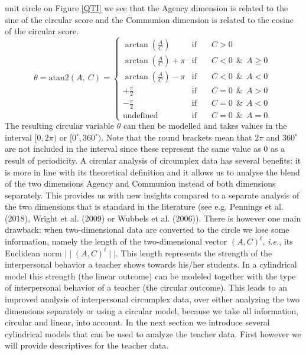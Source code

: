 \documentclass[man]{apa6}
\begin{document}
unit circle on Figure \ref{QTI} we see that the Agency dimension is related to
the sine of the circular score and the Communion dimension is related to the
cosine of the circular score.
\begin{equation}\label{PredVal}
\theta          = \text{atan2}\left(A, \: C\right)  =
\left\{{\begin{array}{lcl}
                                                                       \arctan\left(\frac{A}{C}\right) & \text{if}  \quad&C > 0 \\
\arctan\left(\frac{A}{C}\right) + \pi & \text{if}  \quad& C  <  0  \:\: \&\:\: A \geq 0\\
 \arctan\left(\frac{A}{C}\right) - \pi & \text{if}  \quad&C  <  0 \:\:  \&\:\:A  < 0\\
 +\frac{\pi}{2} & \text{if}  \quad& C  =  0  \:\: \&\:\:A > 0\\
 -\frac{\pi}{2} & \text{if}  \quad& C =  0  \:\: \&\:\:A < 0\\
 \text{undefined} & \text{if} \quad& C =  0   \:\: \&\:\:A = 0.
 \end{array}}
\right.
\end{equation}
The resulting circular variable \(\theta\) can then be modelled and takes values
in the interval \([0, 2\pi)\) or \([0^\circ, 360^\circ)\). Note that the round
brackets mean that \(2\pi\) and \(360^\circ\) are not included in the interval since
these represent the same value as 0 as a result of periodicity. \newline
\indent A circular analysis of circumplex data has several benefits: it is more
in line with its theoretical definition and it allows us to analyse the blend of
the two dimensions Agency and Communion instead of both dimensions separately.
This provides us with new insights compared to a separate analysis of the two
dimensions that is standard in the literature (see e.g.
Pennings et al. (2018), Wright et al. (2009) or
Wubbels et al. (2006)). There is however one main drawback: when
two-dimensional data are converted to the circle we lose some information,
namely the length of the two-dimensional vector \((A, C)^t\), \emph{i.e.}, its
Euclidean norm \(\mid\mid (A, C)^t \mid\mid\). This length represents the
strength of the interpersonal behavior a teacher shows towards his/her students.
In a cylindrical model this strength (the linear outcome) can be modeled
together with the type of interpersonal behavior of a teacher (the circular
outcome). This leads to an improved analysis of interpersonal circumplex data,
over either analyzing the two dimensions separately or using a circular model,
because we take all information, circular and linear, into account. In the next
section we introduce several cylindrical models that can be used to analyze the
teacher data. First however we will provide descriptives for the teacher data.
\end{document}
